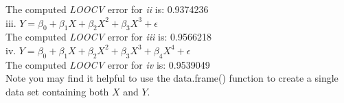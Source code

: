 \documentclass{article}
\begin{document}
\indent The computed \textit{LOOCV} error for \textit{ii} is: 0.9374236 \\
\linebreak iii. $Y = \beta_0 + \beta_1X + \beta_2X^2 + \beta_3X^3 + \epsilon$ \\
\indent The computed \textit{LOOCV} error for \textit{iii} is: 0.9566218 \\
\linebreak iv. $Y = \beta_0 + \beta_1X + \beta_2X^2 + \beta_3X^3 + \beta_4X^4 + \epsilon$ \\
\indent The computed \textit{LOOCV} error for \textit{iv} is: 0.9539049 \\
\linebreak Note you may find it helpful to use the data.frame() function to create a single data set containing both $X$ and $Y$.
\end{document}
